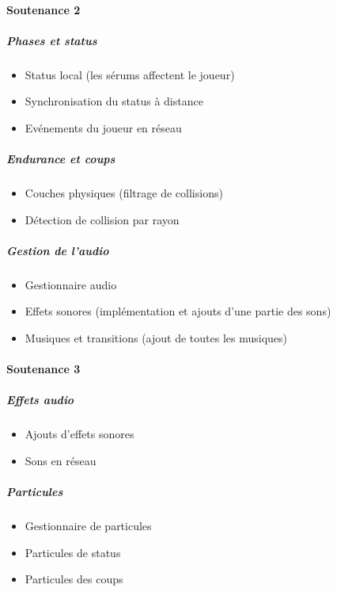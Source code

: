 \documentclass{article}
\begin{document}
\paragraph{Soutenance 2}

\subparagraph{Phases et status}

\begin{itemize}
    \item Status local (les sérums affectent le joueur)
    \item Synchronisation du status à distance
    \item Evénements du joueur en réseau
\end{itemize}

\subparagraph{Endurance et coups}

\begin{itemize}
    \item Couches physiques (filtrage de collisions)
    \item Détection de collision par rayon
\end{itemize}

\subparagraph{Gestion de l'audio}

\begin{itemize}
    \item Gestionnaire audio
    \item Effets sonores (implémentation et ajouts d'une partie des sons)
    \item Musiques et transitions (ajout de toutes les musiques)
\end{itemize}

\paragraph{Soutenance 3}

\subparagraph{Effets audio}

\begin{itemize}
    \item Ajouts d'effets sonores
    \item Sons en réseau
\end{itemize}

\subparagraph{Particules}

\begin{itemize}
    \item Gestionnaire de particules
    \item Particules de status
    \item Particules des coups
\end{itemize}
\end{document}
